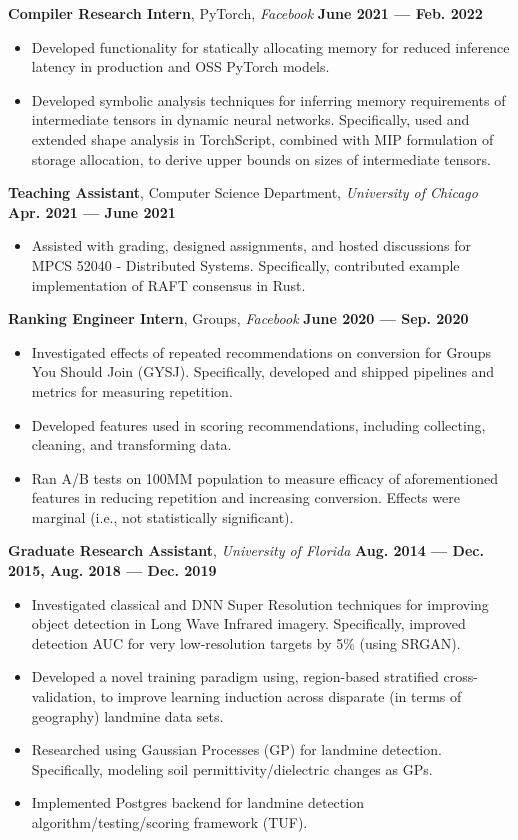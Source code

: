\documentclass[11pt,letterpaper,roman,colorlinks,linkcolor=blue]{moderncv}
\begin{document}
\textbf{Compiler Research Intern}, PyTorch, \emph{Facebook}
\hfill \textbf{June 2021 --- Feb. 2022}
\begin{itemize}
\item Developed functionality for statically allocating memory for reduced inference latency in production and OSS PyTorch models.
\item Developed symbolic analysis techniques for inferring memory requirements of intermediate tensors in dynamic neural networks. Specifically, used and extended shape analysis in TorchScript, combined with MIP formulation of storage allocation, to derive upper bounds on sizes of intermediate tensors.  
\end{itemize}

\textbf{Teaching Assistant}, Computer Science Department, \emph{University of Chicago}
\hfill \textbf{Apr. 2021 --- June 2021}
\begin{itemize}
\item Assisted with grading, designed assignments, and hosted discussions for MPCS 52040 - Distributed Systems. Specifically, contributed example implementation of RAFT consensus in Rust.
\end{itemize}

\textbf{Ranking Engineer Intern}, Groups, \emph{Facebook}
\hfill \textbf{June 2020 --- Sep. 2020}
\begin{itemize}
\item Investigated effects of repeated recommendations on conversion for Groups You Should Join (GYSJ). Specifically, developed and shipped pipelines and metrics for measuring repetition. 
\item Developed features used in scoring recommendations, including collecting, cleaning, and transforming data.
\item Ran A/B tests on 100MM population to measure efficacy of aforementioned features in reducing repetition and increasing conversion. Effects were marginal (i.e., not statistically significant).
\end{itemize}

\textbf{Graduate Research Assistant}, \emph{University of Florida}
\hfill \textbf{Aug. 2014 --- Dec. 2015, Aug. 2018 --- Dec. 2019}
\begin{itemize}
\item Investigated classical and DNN Super Resolution techniques for improving object detection in Long Wave Infrared imagery. Specifically, improved detection AUC for very low-resolution targets by 5\% (using SRGAN).
\item Developed a novel training paradigm using, region-based stratified cross-validation, to improve learning induction across disparate (in terms of geography) landmine data sets.
\item Researched using Gaussian Processes (GP) for landmine detection. Specifically, modeling soil permittivity/dielectric changes as GPs.
\item Implemented Postgres backend for landmine detection algorithm/testing/scoring framework (TUF).
\end{itemize}
\end{document}
